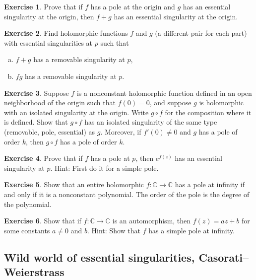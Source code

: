 \documentclass[12pt,openany]{book}
\newcommand{\C}{{\mathbb{C}}}
\theoremstyle{plain}
\theoremstyle{remark}
\theoremstyle{definition}
\newenvironment{exbox}{%
    \def\FrameCommand{\vrule width 1pt \relax\hspace{10pt}}%
    \MakeFramed{\advance\hsize-\width\FrameRestore}%
}{%
    \endMakeFramed
}
\newenvironment{exparts}{%
    \leavevmode\begin{enumerate}[a),noitemsep,topsep=0pt,parsep=0pt,partopsep=0pt]
}{%
    \end{enumerate}
}
\theoremstyle{exercise}
\newtheorem{exercise}{Exercise}[section]
\theoremstyle{example}
\begin{document}
\begin{exbox}
\begin{exercise}
Prove that if $f$ has a pole at the origin and $g$ has an essential
singularity at the origin, then $f+g$ has an essential singularity at the
origin.
\end{exercise}

\begin{exercise}
Find holomorphic functions $f$ and $g$ (a different pair for each part) with
essential singularities at $p$ such that
\begin{exparts}
\item
$f+g$ has a removable singularity at $p$,
\item
$fg$ has a removable singularity at $p$.
\end{exparts}
\end{exercise}

\begin{exercise}
Suppose $f$ is a nonconstant holomorphic function defined in an open neighborhood of the
origin such that $f(0)=0$, and suppose $g$ is holomorphic with
an isolated singularity at the origin.  Write $g \circ f$ for the
composition where it is defined.  Show that $g \circ f$ has an isolated
singularity of the same type (removable, pole, essential) as $g$.
Moreover, if $f'(0) \neq 0$ and $g$ has a pole of order $k$, then $g \circ f$ has a
pole of order $k$.
\end{exercise}

\begin{exercise} \label{exercise:expofpole}
Prove that if $f$ has a pole at $p$,
then $e^{f(z)}$ has an essential singularity at $p$.
Hint: First do it for a simple pole.
\end{exercise}

\begin{exercise}
Show that an entire holomorphic $f \colon \C \to \C$ has a pole at infinity
if and only if it is a nonconstant polynomial.
The order of the pole is the degree of the polynomial.
\end{exercise}

\begin{exercise}
Show that if $f \colon \C \to \C$ is an automorphism, then
$f(z) = az + b$ for
some constants $a \neq 0$ and $b$.  Hint: Show that $f$ has a simple pole at
infinity.
\end{exercise}
\end{exbox}

\subsection{Wild world of essential singularities, Casorati--Weierstrass}
\end{document}
